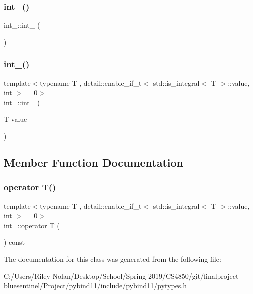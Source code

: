 \subsubsection{\texorpdfstring{int\_()}{int\_()}\hspace{0.1cm}{\footnotesize\ttfamily [1/2]}}
{\footnotesize\ttfamily int\+\_\+\+::int\+\_\+ (\begin{DoxyParamCaption}{ }\end{DoxyParamCaption})\hspace{0.3cm}{\ttfamily [inline]}}

\mbox{\label{classint___a9ec72c4afa30290e22b7ce250b6e537c}} 
\subsubsection{\texorpdfstring{int\_()}{int\_()}\hspace{0.1cm}{\footnotesize\ttfamily [2/2]}}
{\footnotesize\ttfamily template$<$typename T , detail\+::enable\+\_\+if\+\_\+t$<$ std\+::is\+\_\+integral$<$ T $>$\+::value, int $>$  = 0$>$ \\
int\+\_\+\+::int\+\_\+ (\begin{DoxyParamCaption}\item[{T}]{value }\end{DoxyParamCaption})\hspace{0.3cm}{\ttfamily [inline]}}



\subsection{Member Function Documentation}
\mbox{\label{classint___a1f05bd57ed8862505efec70e7341d15d}} 
\subsubsection{\texorpdfstring{operator T()}{operator T()}}
{\footnotesize\ttfamily template$<$typename T , detail\+::enable\+\_\+if\+\_\+t$<$ std\+::is\+\_\+integral$<$ T $>$\+::value, int $>$  = 0$>$ \\
int\+\_\+\+::operator T (\begin{DoxyParamCaption}{ }\end{DoxyParamCaption}) const\hspace{0.3cm}{\ttfamily [inline]}}



The documentation for this class was generated from the following file\+:\begin{DoxyCompactItemize}
\item 
C\+:/\+Users/\+Riley Nolan/\+Desktop/\+School/\+Spring 2019/\+C\+S4850/git/finalproject-\/bluesentinel/\+Project/pybind11/include/pybind11/\mbox{\hyperlink{pytypes_8h}{pytypes.\+h}}\end{DoxyCompactItemize}
